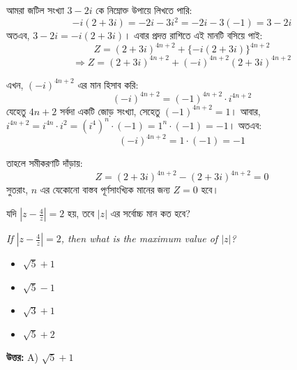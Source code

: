 \documentclass[12pt, a4paper]{article}
\begin{document}
\begin{tcolorbox}[solutionbox={সমাধান (Solution)}]
    \noindent
    আমরা জটিল সংখ্যা $3-2i$ কে নিম্নোক্ত উপায়ে লিখতে পারি:
    \[ -i(2+3i) = -2i - 3i^2 = -2i - 3(-1) = 3 - 2i \]
    অতএব, $3-2i = -i(2+3i)$। এবার প্রদত্ত রাশিতে এই মানটি বসিয়ে পাই:
    \[ Z = (2+3i)^{4n+2} + \{-i(2+3i)\}^{4n+2} \]
    \[ \Rightarrow Z = (2+3i)^{4n+2} + (-i)^{4n+2}(2+3i)^{4n+2} \]
    
    \vspace{0.5em}
    এখন, $(-i)^{4n+2}$ এর মান হিসাব করি:
    \[ (-i)^{4n+2} = (-1)^{4n+2} \cdot i^{4n+2} \]
    যেহেতু $4n+2$ সর্বদা একটি জোড় সংখ্যা, সেহেতু $(-1)^{4n+2} = 1$। আবার, $i^{4n+2} = i^{4n} \cdot i^2 = (i^4)^n \cdot (-1) = 1^n \cdot (-1) = -1$। অতএব:
    \[ (-i)^{4n+2} = 1 \cdot (-1) = -1 \]
    
    \vspace{0.5em}
    তাহলে সমীকরণটি দাঁড়ায়:
    \[ Z = (2+3i)^{4n+2} - (2+3i)^{4n+2} = 0 \]
    সুতরাং, $n$ এর যেকোনো বাস্তব পূর্ণসাংখ্যিক মানের জন্য $Z = 0$ হবে।
\end{tcolorbox}
\begin{tcolorbox}[questionbox={প্রশ্ন (Question) 13}]
    \noindent
    যদি $|z - \frac{4}{z}| = 2$ হয়, তবে $|z|$ এর সর্বোচ্চ মান কত হবে?
    
    \vspace{0.8em}
    \begin{english}
    \noindent\textit{\color{darkgray}
    If $|z - \frac{4}{z}| = 2$, then what is the maximum value of $|z|$?
    }
    \end{english}
\end{tcolorbox}

\begin{itemize}[label={}, leftmargin=1cm, itemsep=0.5em]
    \item[\textbf{A)}] $\sqrt{5} + 1$
    \item[\textbf{B)}] $\sqrt{5} - 1$
    \item[\textbf{C)}] $\sqrt{3} + 1$
    \item[\textbf{D)}] $\sqrt{5} + 2$
\end{itemize}

\vspace{0.5em}
\begin{tcolorbox}[answerbox]
    \textbf{\color{success} উত্তর:} A) $\sqrt{5} + 1$
\end{tcolorbox}
\vspace{1em}
\end{document}
